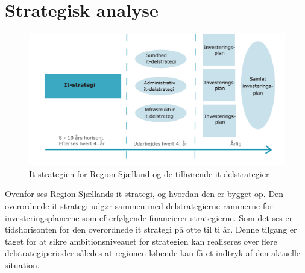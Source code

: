 \section{Strategisk analyse}
\begin{figure}[H]
	\centering
	\includegraphics[width=\linewidth]{Materials/Strategy}
	\caption{It-strategien for Region Sjælland og de tilhørende it-delstrategier}
\end{figure}
Ovenfor ses Region Sjællands it strategi, og hvordan den er bygget op. Den overordnede it strategi udgør sammen med delstrategierne rammerne for investeringsplanerne som efterfølgende financierer strategierne. Som det ses er tidshorisonten for den overordnede it strategi på otte til ti år. Denne tilgang er taget for at sikre ambitionsniveauet for strategien kan realiseres over flere delstrategiperioder således at regionen løbende kan få et indtryk af den aktuelle situation.
